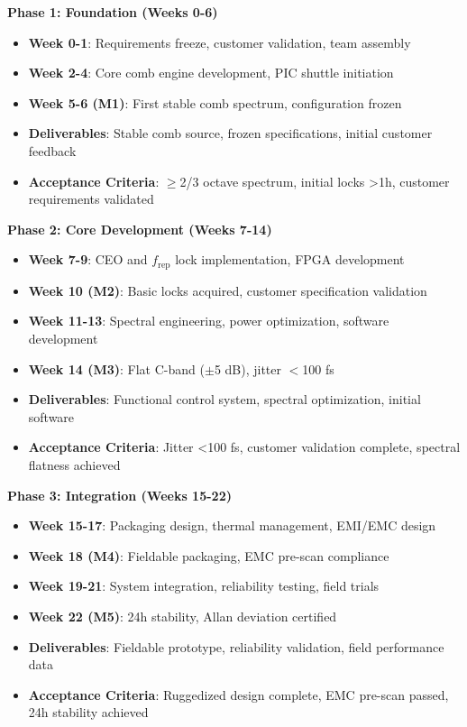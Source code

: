 \documentclass[11pt,a4paper]{article}
\begin{document}
\textbf{Phase 1: Foundation (Weeks 0-6)}
\begin{itemize}
\item \textbf{Week 0-1}: Requirements freeze, customer validation, team assembly
\item \textbf{Week 2-4}: Core comb engine development, PIC shuttle initiation
\item \textbf{Week 5-6 (M1)}: First stable comb spectrum, configuration frozen
\item \textbf{Deliverables}: Stable comb source, frozen specifications, initial customer feedback
\item \textbf{Acceptance Criteria}: $\geq$2/3 octave spectrum, initial locks >1h, customer requirements validated
\end{itemize}

\textbf{Phase 2: Core Development (Weeks 7-14)}
\begin{itemize}
\item \textbf{Week 7-9}: CEO and $f_{\text{rep}}$ lock implementation, FPGA development
\item \textbf{Week 10 (M2)}: Basic locks acquired, customer specification validation
\item \textbf{Week 11-13}: Spectral engineering, power optimization, software development
\item \textbf{Week 14 (M3)}: Flat C-band ($\pm$5 dB), jitter $<$100 fs
\item \textbf{Deliverables}: Functional control system, spectral optimization, initial software
\item \textbf{Acceptance Criteria}: Jitter <100 fs, customer validation complete, spectral flatness achieved
\end{itemize}

\textbf{Phase 3: Integration (Weeks 15-22)}
\begin{itemize}
\item \textbf{Week 15-17}: Packaging design, thermal management, EMI/EMC design
\item \textbf{Week 18 (M4)}: Fieldable packaging, EMC pre-scan compliance
\item \textbf{Week 19-21}: System integration, reliability testing, field trials
\item \textbf{Week 22 (M5)}: 24h stability, Allan deviation certified
\item \textbf{Deliverables}: Fieldable prototype, reliability validation, field performance data
\item \textbf{Acceptance Criteria}: Ruggedized design complete, EMC pre-scan passed, 24h stability achieved
\end{itemize}
\end{document}
